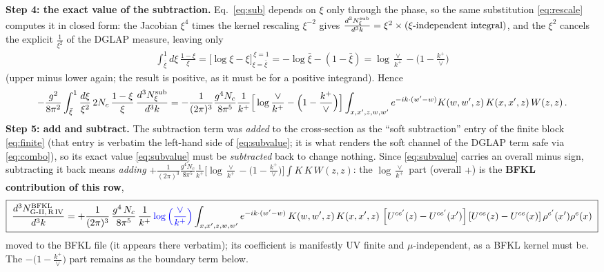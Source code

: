 \documentclass[10pt]{article}
\begin{document}
\textbf{Step 4: the exact value of the subtraction.} Eq.~\eqref{eq:sub} depends on $\xi$ only
through the phase, so the same substitution \eqref{eq:rescale} computes it in closed form: the
Jacobian $\xi^{4}$ times the kernel rescaling $\xi^{-2}$ gives
$\frac{d^{3}N^{\rm sub}_{\xi}}{d^{3}k}=\xi^{2}\times(\xi\text{-independent integral})$, and the
$\xi^{2}$ cancels the explicit $\frac{1}{\xi^{2}}$ of the DGLAP measure, leaving only
\begin{align}\label{eq:softint}
\int_{\bar\xi}^{1}d\xi\,\frac{1-\xi}{\xi}
=\Big[\log\xi-\xi\Big]_{\xi=\bar\xi}^{\,\xi=1}
=-\log\bar\xi-(1-\bar\xi)
=\log\frac{\vee}{k^{+}}-\Big(1-\frac{k^{+}}{\vee}\Big)
\end{align}
(upper minus lower again; the result is positive, as it must be for a positive integrand). Hence
\begin{align}\label{eq:subvalue}
-\frac{g^{2}}{8\pi^{2}}\int_{\bar\xi}^{1}\frac{d\xi}{\xi^{2}}\,2N_c\,\frac{1-\xi}{\xi}\,\frac{d^{3}N^{\rm sub}_{\xi}}{d^{3}k} =-\frac{1}{(2\pi)^{3}}\frac{g^{4}N_{c}}{8\pi^{5}}\frac{1}{k^{+}}\Big[\log\frac{\vee}{k^{+}}-\Big(1-\frac{k^{+}}{\vee}\Big)\Big]\int_{x,x',z,w,w'}e^{-ik\cdot(w'-w)}K(w,w',z)\,K(x,x',z)\,W(z,z)\,.
\end{align}
\textbf{Step 5: add and subtract.} The subtraction term was \emph{added} to the cross-section as
the ``soft subtraction'' entry of the finite block \eqref{eq:finite} (that entry is verbatim the
left-hand side of \eqref{eq:subvalue}; it is what renders the soft channel of the DGLAP term
safe via \eqref{eq:combo}), so its exact value \eqref{eq:subvalue} must be \emph{subtracted} back
to change nothing. Since \eqref{eq:subvalue} carries an overall minus sign, subtracting it back
means \emph{adding}
$+\frac{1}{(2\pi)^{3}}\frac{g^{4}N_{c}}{8\pi^{5}}\frac{1}{k^{+}}
\big[\log\frac{\vee}{k^{+}}-\big(1-\frac{k^{+}}{\vee}\big)\big]\int K\,K\,W(z,z)$: the
$\log\frac{\vee}{k^{+}}$ part (overall $+$) is the
\textbf{BFKL contribution of this row},
\begin{align}\label{eq:bfkl}
\boxed{\;\frac{d^{3}N^{\rm BFKL}_{\rm G\text{-}II,\,R\,IV}}{d^{3}k} = +\frac{1}{(2\pi)^{3}}\,\frac{g^{4}\,N_{c}}{8\pi^{5}}\,\frac{1}{k^{+}}\,{\color{blue}\log\Big(\frac{\vee}{k^{+}}\Big)}\int_{x,x',z,w,w'}e^{-ik\cdot (w'-w)}\,K(w,w',z)\,K(x,x',z)\,
\left[U^{ce'}(z) - U^{ce'}(x')\right]\left[U^{ce}(z) - U^{ce}(x)\right]\rho^{e'}(x')\rho^{e}(x)\;}
\end{align}
moved to the BFKL file (it appears there verbatim); its coefficient is manifestly UV finite and
$\mu$-independent, as a BFKL kernel must be. The $-\big(1-\frac{k^{+}}{\vee}\big)$ part remains as
the boundary term below.
\end{document}
